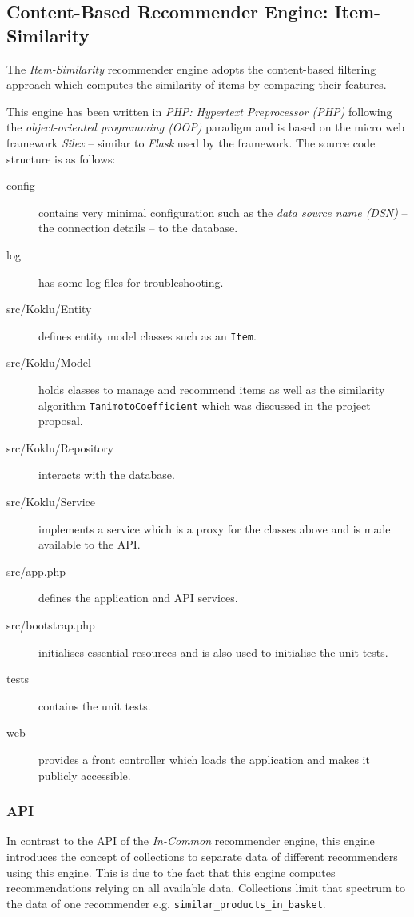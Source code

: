 \subsection{Content-Based Recommender Engine: Item-Similarity}

The \emph{Item-Similarity} recommender engine adopts the content-based filtering approach which computes the similarity of items by comparing their features.

This engine has been written in \emph{PHP: Hypertext Preprocessor (PHP)} following the \emph{object-oriented programming (OOP)} paradigm and is based on the micro web framework \emph{Silex} -- similar to \emph{Flask} used by the framework. The source code structure is as follows:

\begin{description}
    \item[config] contains very minimal configuration such as the \emph{data source name (DSN)} -- the connection details -- to the database.
    \item[log] has some log files for troubleshooting.
    \item[src/Koklu/Entity] defines entity model classes such as an \texttt{Item}.
    \item[src/Koklu/Model] holds classes to manage and recommend items as well as the similarity algorithm \texttt{TanimotoCoefficient} which was discussed in the project proposal.
    \item[src/Koklu/Repository] interacts with the database.
    \item[src/Koklu/Service] implements a service which is a proxy for the classes above and is made available to the API.
    \item[src/app.php] defines the application and API services.
    \item[src/bootstrap.php] initialises essential resources and is also used to initialise the unit tests.
    \item[tests] contains the unit tests.
    \item[web] provides a front controller which loads the application and makes it publicly accessible.
\end{description}

\subsubsection{API}

In contrast to the API of the \emph{In-Common} recommender engine, this engine introduces the concept of collections to separate data of different recommenders using this engine. This is due to the fact that this engine computes recommendations relying on all available data. Collections limit that spectrum to the data of one recommender e.g. \texttt{similar_products_in_basket}.


